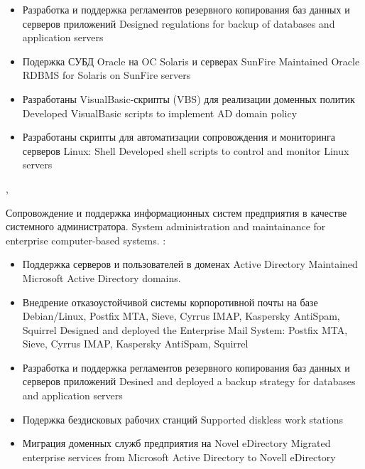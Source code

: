 \documentclass[11pt,a4paper,sans]{moderncv}        %
\begin{document}
{\begin{itemize}
\begin{itemize}
\begin{itemize}
				{Designed traffic balance of mail system. Audited mail traffic.}
			\item {}
				{Реализована отказоустойчивость системы с использованием технологий виртуализации Linux/VServer и ipvs}
				{Designed fault tolerate mail system using Linux/VServer and ipvs}
			\end{itemize}
		\item {}
			{Разработка и поддержка регламентов резервного копирования баз данных и серверов приложений}	
			{Designed regulations for backup of databases and application servers}
		\item {}
			{Подержка СУБД Oracle на OC Solaris и серверах SunFire}
			{Maintained Oracle RDBMS for Solaris on SunFire servers}
		\item {}
			{Разработаны VisualBasic-скрипты (VBS) для реализации доменных политик}
			{Developed VisualBasic scripts to implement AD domain policy}
		\item {}
			{Разработаны скрипты для автоматизации сопровождения и мониторинга серверов Linux: Shell}
			{Developed shell scripts to control and monitor Linux servers}
	\end{itemize}
\end{itemize}
}

{\protect{}}
{\cityperm, \country}
{}
{
{Сопровождение и поддержка информационных систем предприятия в качестве системного администратора.}
{System administration and maintainance for enterprise computer-based systems.}\newline{}
\achievements:
\begin{itemize}
	\item {}
		{Поддержка серверов и пользователей в доменах Active Directory}
		{Maintained Microsoft Active Directory domains.}
	\item {}
		{Внедрение отказоустойчивой системы корпоротивной почты на базе Debian/Linux, Postfix MTA, Sieve, Cyrrus IMAP, Kaspersky AntiSpam, Squirrel}
		{Designed and deployed the Enterprise Mail System: Postfix MTA, Sieve, Cyrrus IMAP, Kaspersky AntiSpam, Squirrel}
	\item {}
		{Разработка и поддержка регламентов резервного копирования баз данных и серверов приложений}	
		{Desined and deployed a backup strategy for databases and application servers}
	\item {}
		{Подержка бездисковых рабочих станций}
		{Supported diskless work stations}
	\item {}
		{Миграция доменных служб предприятия на Novel eDirectory}
		{Migrated enterprise services from Microsoft Active Directory to Novell eDirectory}
\end{itemize}
}
\end{document}
